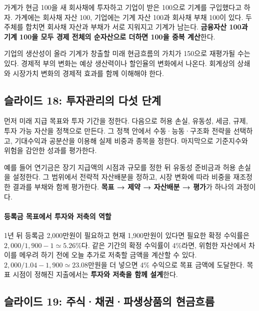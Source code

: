 \documentclass[11pt,a4paper]{article}
\begin{document}
가계가 현금 100을 새 회사채에 투자하고 기업이 받은 100으로 기계를 구입했다고 하자. 가계에는 회사채 자산 100, 기업에는 기계 자산 100과 회사채 부채 100이 있다. 두 주체를 합치면 회사채 자산과 부채가 서로 지워지고 기계가 남는다. \textbf{금융자산 100과 기계 100을 모두 경제 전체의 순자산으로 더하면 100을 중복 계산}한다.
\par

기업의 생산성이 올라 기계가 창출할 미래 현금흐름의 가치가 150으로 재평가될 수는 있다. 경제적 부의 변화는 예상 생산력이나 할인율의 변화에서 나온다. 회계상의 상쇄와 시장가치 변화의 경제적 효과를 함께 이해해야 한다.
\par

\subsection{슬라이드 18: 투자관리의 다섯 단계}

먼저 미래 지급 목표와 투자 기간을 정한다. 다음으로 허용 손실, 유동성, 세금, 규제, 투자 가능 자산을 정책으로 만든다. 그 정책 안에서 수동·능동·구조화 전략을 선택하고, 기대수익과 공분산을 이용해 실제 비중과 종목을 정한다. 마지막으로 기준지수와 위험을 감안한 성과를 평가한다.
\par

예를 들어 연기금은 장기 지급액의 시점과 규모를 정한 뒤 유동성 준비금과 허용 손실을 설정한다. 그 범위에서 전략적 자산배분을 정하고, 시장 변화에 따라 비중을 재조정한 결과를 부채와 함께 평가한다. \textbf{목표 → 제약 → 자산배분 → 평가}가 하나의 과정이다.
\par

\paragraph{등록금 목표에서 투자와 저축의 역할}

1년 뒤 등록금 2,000만원이 필요하고 현재 1,900만원이 있다면 필요한 확정 수익률은 $2{,}000/1{,}900-1\simeq5.26\%$다. 같은 기간의 확정 수익률이 4\%라면, 위험한 자산에서 차이를 메우려 하기 전에 오늘 추가로 저축할 금액을 계산할 수 있다. $2{,}000/1.04-1{,}900\simeq23.08$만원을 더 넣으면 4\% 수익으로 목표 금액에 도달한다. 목표 시점이 정해진 지출에서는 \textbf{투자와 저축을 함께 설계}한다.
\par

\subsection{슬라이드 19: 주식·채권·파생상품의 현금흐름}
\end{document}
